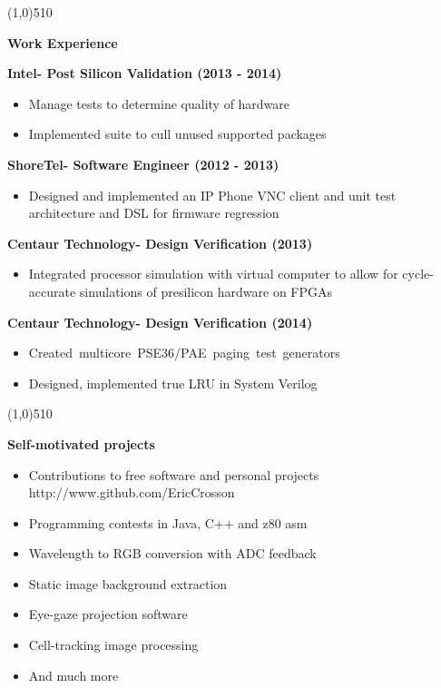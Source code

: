 \documentclass{report}
\newcommand{\cut}{\begin{center} \line(1,0){510} \end{center}}
\begin{document}
\cut{}

\textbf{Work Experience} \\
\begin{paracol}{2}
  \textbf{Intel- Post Silicon Validation (2013 - 2014)}
  \begin{itemize}
    \renewcommand{\labelitemi}{$\circ$}
  \item Manage tests to determine quality of hardware
  \item Implemented suite to cull unused supported packages
  \end{itemize}

  \textbf{ShoreTel- Software Engineer (2012 - 2013)}
  \begin{itemize}
    \renewcommand{\labelitemi}{$\circ$}
  \item Designed and implemented an IP Phone VNC client and unit test architecture and DSL for firmware regression
  \end{itemize}

  \switchcolumn
  \textbf{Centaur Technology- Design Verification (2013)}
  \begin{itemize}
    \renewcommand{\labelitemi}{$\circ$}
  \item Integrated processor simulation with virtual computer to allow
    for cycle-accurate simulations of presilicon hardware on FPGAs
  \end{itemize}

  \textbf{Centaur Technology- Design Verification (2014)}
  \begin{itemize}
    \renewcommand{\labelitemi}{$\circ$}
  \item \mbox{Created multicore PSE36/PAE paging test generators}
  \item Designed, implemented true LRU in System Verilog
  \end{itemize}
\end{paracol}

\cut

\textbf{Self-motivated projects}
\begin{paracol}{2}

  \begin{itemize}
    \renewcommand{\labelitemi}{$\circ$}
  \item Contributions to free software and personal projects
    http://www.github.com/EricCrosson
  \item Programming contests in Java, C++ and z80 asm
  \item Wavelength to RGB conversion with ADC feedback
  \end{itemize}

  \switchcolumn
  \begin{itemize}
    \renewcommand{\labelitemi}{$\circ$}
  \item Static image background extraction
  \item Eye-gaze projection software
  \item Cell-tracking image processing
  \item And much more
  \end{itemize}
\end{paracol}
\end{document}
